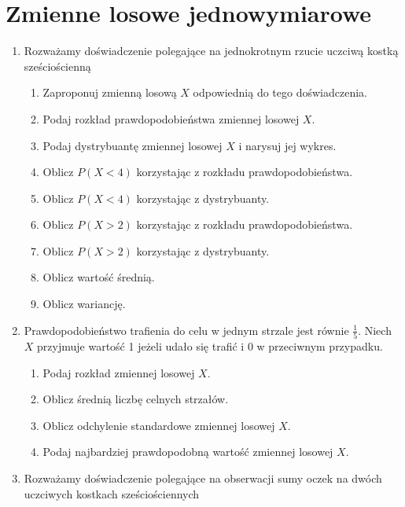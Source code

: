 \documentclass{mwart}
\newcommand{\ans}[1]{}
\newcommand{\ans}[1]{\emph{Odpowiedź:} #1}
\begin{document}
\section{Zmienne losowe jednowymiarowe}
\begin{enumerate}
\item Rozważamy doświadczenie polegające na jednokrotnym rzucie uczciwą kostką sześciościenną
\begin{enumerate}
\item Zaproponuj zmienną losową $X$ odpowiednią do tego doświadczenia. \ans{$X\colon\Omega\to\{1,\ldots,6\}$}
\item Podaj rozkład prawdopodobieństwa zmiennej losowej $X$. \ans{$P(X=i)=\frac{1}{6}$}
\item Podaj dystrybuantę zmiennej losowej $X$ i narysuj jej wykres.
\item Oblicz $P(X<4)$ korzystając z rozkładu prawdopodobieństwa. \ans{$P(X<4)=P(X=1)+P(X=2)+P(X=3)$}
\item Oblicz $P(X<4)$ korzystając z dystrybuanty. \ans{$P(X<4)=F_X(4)$}
\item Oblicz $P(X>2)$ korzystając z rozkładu prawdopodobieństwa. \ans{$P(X>2)=P(X=3)+\ldots+P(X=6)$}
\item Oblicz $P(X>2)$ korzystając z dystrybuanty. \ans{$P(X>2)=1-P(X\leq 2)=1-P(X<3)=1-F(3)$}
\item Oblicz wartość średnią. \ans{$EX=\frac{21}{6}=3{,}5$}
\item Oblicz wariancję. \ans{$D^2X=\frac{1}{6}((-2{,}5)^2+(-1{,}5)^2+(-0{,}5)^2+2{,}5^2+1{,}5^2+0{,}5^2)$}
\end{enumerate}
\item Prawdopodobieństwo trafienia do celu w jednym strzale jest równie $\frac{1}{5}$. Niech $X$ przyjmuje wartość 1 jeżeli udało się trafić i 0 w przeciwnym przypadku.
\begin{enumerate}
\item Podaj rozkład zmiennej losowej $X$. \ans{$P(X=1)=p\quad P(X=0)=1-p$}
\item Oblicz średnią liczbę celnych strzałów. \ans{$EX=p=0{,}2$}
\item Oblicz odchylenie standardowe zmiennej losowej $X$. \ans{$DX=\sqrt{p(1-p)}=0{,}4$}
\item Podaj najbardziej prawdopodobną wartość zmiennej losowej $X$. \ans{$0$}
\end{enumerate}
\item Rozważamy doświadczenie polegające na obserwacji sumy oczek na dwóch uczciwych kostkach sześciościennych

\end{enumerate}
\end{document}
